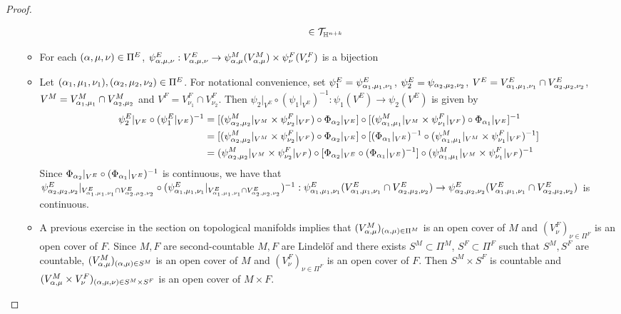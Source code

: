 \documentclass{book}
\begin{document}
\begin{proof}
\begin{enumerate}
\begin{itemize}
\begin{align*}
					& \in \mathcal{T}_{\mathbb{H}^{n+k}}
				\end{align*}
				\item For each $(\alpha, \mu, \nu) \in \Pi^E$, $\psi^E_{\alpha, \mu, \nu}: V^E_{\alpha, \mu, \nu} \rightarrow \psi^M_{\alpha, \mu}(V^M_{\alpha, \mu}) \times \psi^F_{\nu}(V^F_{\nu})$ is a bijection
				\item Let $(\alpha_1, \mu_1, \nu_1), (\alpha_2, \mu_2, \nu_2) \in \Pi^E$. For notational convenience, set $\psi^E_1 = \psi^E_{\alpha_1, \mu_1, \nu_1}$, $\psi^E_2 = \psi_{\alpha_2, \mu_2, \nu_2}$, $V^E = V^E_{\alpha_1, \mu_1, \nu_1} \cap V^E_{\alpha_2, \mu_2, \nu_2}$, $V^M = V_{\alpha_1, \mu_1}^M \cap V^M_{\alpha_2, \mu_2}$ and $V^F = V^F_{\nu_1} \cap V^F_{\nu_2}$. Then $\psi_2|_{V^E} \circ (\psi_1|_{V^E})^{-1}: \psi_1(V^E) \rightarrow \psi_2(V^E)$ is given by
				\begin{align*}
					\psi^E_2|_{V^E} \circ (\psi^E_1|_{V^E})^{-1}
					& = [(\psi_{\alpha_2, \mu_2}^M|_{V^M} \times \psi_{\nu_2}^F|_{V^F}) \circ \Phi_{\alpha_2}|_{V^E}] \circ [(\psi_{\alpha_1, \mu_1}^M|_{V^M} \times \psi_{\nu_1}^F|_{V^F}) \circ \Phi_{\alpha_1}|_{V^E}]^{-1} \\
					& = [(\psi_{\alpha_2, \mu_2}^M|_{V^M} \times \psi_{\nu_2}^F|_{V^F}) \circ \Phi_{\alpha_2}|_{V^E}] \circ [(\Phi_{\alpha_1}|_{V^E})^{-1} \circ (\psi_{\alpha_1, \mu_1}^M|_{V^M} \times \psi_{\nu_1}^F|_{V^F})^{-1}] \\
					& = (\psi_{\alpha_2, \mu_2}^M|_{V^M} \times \psi_{\nu_2}^F|_{V^F}) \circ [\Phi_{\alpha_2}|_{V^E} \circ (\Phi_{\alpha_1}|_{V^E})^{-1}] \circ (\psi_{\alpha_1, \mu_1}^M|_{V^M} \times \psi_{\nu_1}^F|_{V^F})^{-1}
				\end{align*}
				Since $\Phi_{\alpha_2}|_{V^E} \circ (\Phi_{\alpha_1}|_{V^E})^{-1}$ is continuous, we have that 
				$\psi^E_{\alpha_2, \mu_2, \nu_2}|_{V^E_{\alpha_1, \mu_1, \nu_1} \cap V^E_{\alpha_2, \mu_2, \nu_2}} \circ (\psi^E_{\alpha_1, \mu_1, \nu_1}|_{V^E_{\alpha_1, \mu_1, \nu_1} \cap V^E_{\alpha_2, \mu_2, \nu_2}})^{-1}: \psi^E_{\alpha_1, \mu_1, \nu_1}(V^E_{\alpha_1, \mu_1, \nu_1} \cap V^E_{\alpha_2, \mu_2, \nu_2}) \rightarrow \psi^E_{\alpha_2, \mu_2, \nu_2}(V^E_{\alpha_1, \mu_1, \nu_1} \cap V^E_{\alpha_2, \mu_2, \nu_2})$
				is continuous.
				\item A previous exercise in the section on topological manifolds implies that $(V^M_{\alpha, \mu})_{(\alpha, \mu) \in \Pi^M}$ is an open cover of $M$ and $(V^F_{\nu})_{\nu \in \Pi^F}$ is an open cover of $F$. Since $M,F$ are second-countable $M,F$ are Lindel\"{o}f and there exists $S^M \subset \Pi^M$, $S^F \subset \Pi^F$ such that $S^M, S^F$ are countable, $(V_{\alpha, \mu}^M )_{(\alpha, \mu) \in S^M}$ is an open cover of $M$ and $(V^F_{\nu})_{\nu \in \Pi^F}$ is an open cover of $F$. Then $S^M \times S^F$ is countable and $(V_{\alpha, \mu}^M \times V_{\nu}^F)_{(\alpha, \mu, \nu) \in S^M \times S^F}$ is an open cover of $M \times F$. \\

\end{itemize}
\end{enumerate}
\end{proof}
\end{document}
